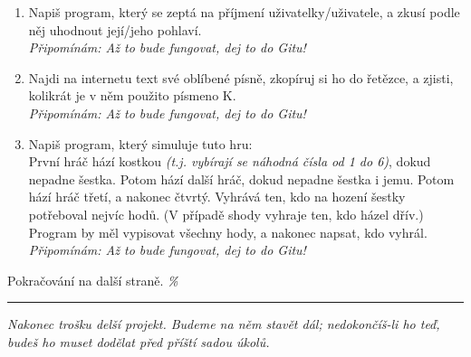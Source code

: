\documentclass[a4paper,10pt]{article}
\newcommand\startsection[1]{
     \vspace{0.2ex}
    \hrule
    {\fontspec{Oxygen} \tiny
     \vspace{-1ex}
     \emph{#1}
     \vspace{-1.5em}
    }
}
\begin{document}
\begin{enumerate}[resume]

\item Napiš program, který se zeptá na příjmení uživatelky/uživatele,
    a zkusí podle něj uhodnout její/jeho pohlaví.
    \\\emph{\small Připomínám: Až to bude fungovat, dej to do Gitu!}

\item Najdi na internetu text své oblíbené písně, zkopíruj si ho do řetězce,
    a zjisti, kolikrát je v něm použito písmeno K.
    \\\emph{\small Připomínám: Až to bude fungovat, dej to do Gitu!}

\item Napiš program, který simuluje tuto hru:
    \\První hráč hází kostkou
    \emph{(t.j. vybírají se náhodná čísla od 1 do 6)},
    dokud nepadne šestka.
    Potom hází další hráč, dokud nepadne šestka i jemu.
    Potom hází hráč třetí, a nakonec čtvrtý.
    Vyhrává ten, kdo na hození šestky potřeboval nejvíc hodů.
    (V případě shody vyhraje ten, kdo házel dřív.)
    \\Program by měl vypisovat všechny hody, a nakonec napsat, kdo vyhrál.
    \\\emph{\small Připomínám: Až to bude fungovat, dej to do Gitu!}

\end{enumerate}

\vfill

Pokračování na další straně. \hfill \emph{\%}

\newpage

\startsection{Nakonec trošku delší projekt. Budeme na něm stavět dál; nedokončíš-li ho teď, budeš ho muset dodělat před příští sadou úkolů.}

\begin{center}
\end{center}
\end{document}
